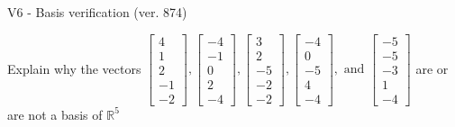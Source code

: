 \begin{exercise}
  \begin{exerciseTitle}V6 - Basis verification (ver. 874)\end{exerciseTitle}
  \begin{exerciseStatement}
    Explain why the vectors \(\left[\begin{array}{r}
4 \\
1 \\
2 \\
-1 \\
-2
\end{array}\right] , \left[\begin{array}{r}
-4 \\
-1 \\
0 \\
2 \\
-4
\end{array}\right] , \left[\begin{array}{r}
3 \\
2 \\
-5 \\
-2 \\
-2
\end{array}\right] , \left[\begin{array}{r}
-4 \\
0 \\
-5 \\
4 \\
-4
\end{array}\right] , \text{ and } \left[\begin{array}{r}
-5 \\
-5 \\
-3 \\
1 \\
-4
\end{array}\right]\) are or are not a basis of \(\mathbb{R}^5\)	



\end{exerciseStatement}
\end{exercise}
